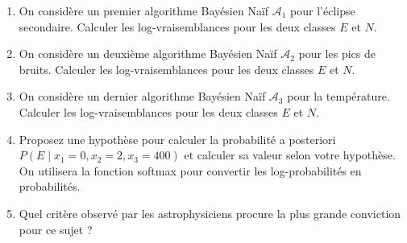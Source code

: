 \documentclass[solutions]{../exercices}
\begin{document}
\begin{exercice}
		\begin{enumerate}
			\item On considère un premier algorithme Bayésien Naïf $\mathcal{A}_1$ pour l'éclipse secondaire. Calculer les log-vraisemblances pour les deux classes $E$ et $N$.
			\item On considère un deuxième algorithme Bayésien Naïf $\mathcal{A}_2$ pour les pics de bruits. Calculer les log-vraisemblances pour les deux classes $E$ et $N$.
			\item On considère un dernier algorithme Bayésien Naïf $\mathcal{A}_3$ pour la température. Calculer les log-vraisemblances pour les deux classes $E$ et $N$.
			\item Proposez une hypothèse pour calculer la probabilité a posteriori $P(E \mid x_1 = 0, x_2 = 2, x_3 = 400)$ et calculer sa valeur selon votre hypothèse. On utilisera la fonction softmax pour convertir les log-probabilités en probabilités.
			\item Quel critère observé par les astrophysiciens procure la plus grande conviction pour ce sujet ?
		\end{enumerate}

	\end{exercice}
\end{document}

